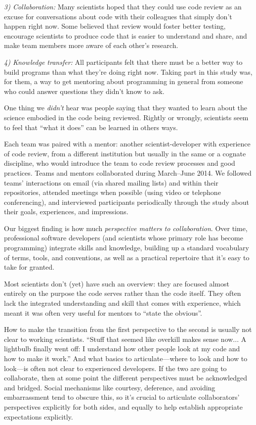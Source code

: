\documentclass[10pt,twocolumn]{article}
\begin{document}
\noindent \emph{3) Collaboration:}
Many scientists hoped that they could use code review
as an excuse for conversations about code with their colleagues that simply don't happen right now.
Some believed that review would foster better testing,
encourage scientists to produce code that is easier to understand and share,
and make team members more aware of each other's research.

\noindent \emph{4) Knowledge transfer:}
All participants felt that there must be a better way to build programs than what they're doing right now.
Taking part in this study was,
for them,
a way to get mentoring about programming in general from someone who could answer questions they didn't know to ask.

One thing we \emph{didn't} hear was people saying that
they wanted to learn about the science embodied in the code being reviewed.
Rightly or wrongly,
scientists seem to feel that ``what it does'' can be learned in others ways.

Each team was paired with a mentor:
another scientist-developer with experience of code review,
from a different institution but usually in the same or a cognate discipline,
who would introduce the team to code review processes and good practices.
Teams and mentors collaborated during March--June 2014.
We followed teams' interactions on email (via shared mailing lists) and within their repositories,
attended meetings when possible (using video or telephone conferencing),
and interviewed participants periodically through the study about their goals, experiences, and impressions.

Our biggest finding is how much \emph{perspective matters to collaboration}.
Over time,
professional software developers
(and scientists whose primary role has become programming)
integrate skills and knowledge,
building up a standard vocabulary of terms, tools, and conventions,
as well as a practical repertoire that it's easy to take for granted.

Most scientists don't (yet) have such an overview:
they are focused almost entirely on the purpose the code serves rather than the code itself.
They often lack the integrated understanding and skill that comes with experience,
which meant it was often very useful for mentors to ``state the obvious''.

How to make the transition from the first perspective to the second is usually not clear to working scientists.
``Stuff that seemed like overkill makes sense now...
A lightbulb finally went off:
I understand how other people look at my code and how to make it work.''
And what basics to articulate---where to look and how to look---is often not clear to experienced developers.
If the two are going to collaborate,
then at some point the different perspectives must be acknowledged and bridged.
Social mechanisms like courtesy, deference, and avoiding embarrassment tend to obscure this,
so it's crucial to articulate collaborators' perspectives explicitly for both sides,
and equally to help establish appropriate expectations explicitly.
\end{document}
